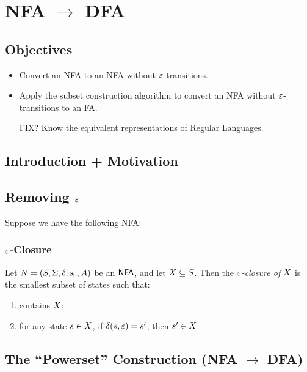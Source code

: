 \chapter{NFA $\to$ DFA}

\section{Objectives}

\begin{itemize}
	\item Convert an NFA to an NFA without $\varepsilon$-transitions.
	\item Apply the subset construction algorithm to convert an NFA without $\varepsilon$-transitions to an FA.
	\item [FIX?] Know the equivalent representations of Regular Languages.
\end{itemize}

\section{Introduction + Motivation}

\section{Removing $\varepsilon$}

Suppose we have the following NFA:


\subsection{$\varepsilon$-Closure}

\begin{definition}
	Let $N = (S, \Sigma, \delta, s_0, A)$ be an $\textsf{NFA}$, and let $X \subseteq S$.
	Then the \emph{$\varepsilon$-closure of $X$} is the smallest subset of states such that:
	\begin{enumerate}
		\item contains $X$;
		\item for any state $s \in X$, if $\delta(s, \varepsilon) = s'$, then $s' \in X$.
	\end{enumerate}
\end{definition}

\section{The ``Powerset'' Construction (NFA $\to$ DFA)}

